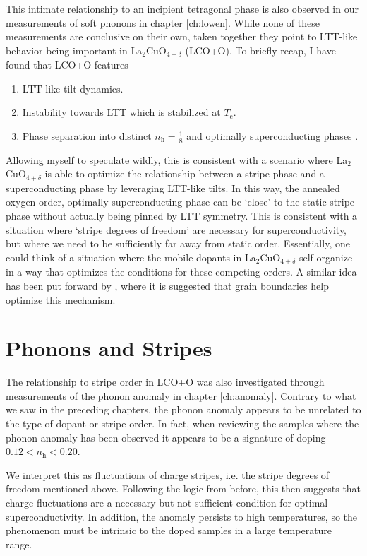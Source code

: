 This intimate relationship to an incipient tetragonal phase is also observed in our measurements of soft phonons in chapter \ref{ch:lowen}. While none of these measurements are conclusive on their own, taken together they point to LTT-like behavior being important in La$_2$CuO$_{4+\delta}$ (LCO+O). To briefly recap, I have found that LCO+O features

\begin{enumerate}
    \item LTT-like tilt dynamics.
    \item Instability towards LTT which is stabilized at $T_\text{c}$.
    \item Phase separation into distinct $n_\text{h}=\frac{1}{8}$ and optimally superconducting phases \cite{Mohottala2006,Udby2013}.
\end{enumerate}

\noindent Allowing myself to speculate wildly, this is consistent with a scenario where La$_2$CuO$_{4+\delta}$ is able to optimize the relationship between a stripe phase and a superconducting phase by leveraging LTT-like tilts. In this way, the annealed oxygen order, optimally superconducting phase can be `close' to the static stripe phase without actually being pinned by LTT symmetry. This is consistent with a situation where `stripe degrees of freedom' are necessary for superconductivity, but where we need to be sufficiently far away from static order. Essentially, one could think of a situation where the mobile dopants in La$_2$CuO$_{4+\delta}$ self-organize in a way that optimizes the conditions for these competing orders. A similar idea has been put forward by \citeauthor{Poccia2017} \cite{Poccia2017}, where it is suggested that grain boundaries help optimize this mechanism.

\section{Phonons and Stripes}
The relationship to stripe order in LCO+O was also investigated through measurements of the phonon anomaly in chapter \ref{ch:anomaly}. Contrary to what we saw in the preceding chapters, the phonon anomaly appears to be unrelated to the type of dopant or stripe order. In fact, when reviewing the samples where the phonon anomaly has been observed it appears to be a signature of doping $0.12 < n_\text{h} < 0.20$.

We interpret this as fluctuations of charge stripes, i.e. the stripe degrees of freedom mentioned above. Following the logic from before, this then suggests that charge fluctuations are a necessary but not sufficient condition for optimal superconductivity. In addition, the anomaly persists to high temperatures, so the phenomenon must be intrinsic to the doped samples in a large temperature range.


